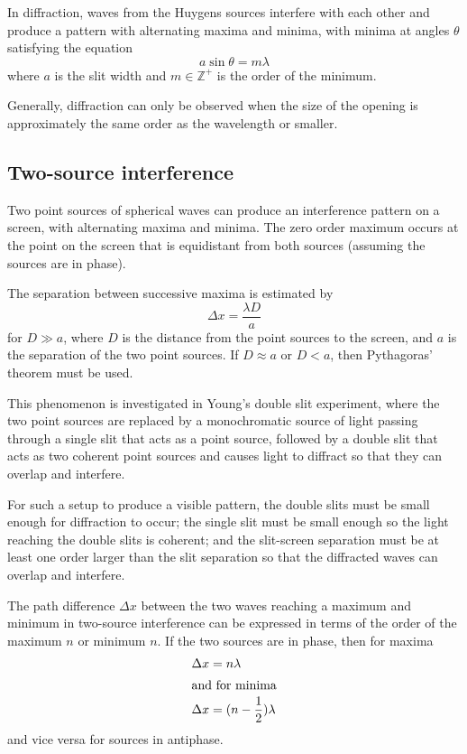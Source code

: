 \documentclass[Physics.tex]{subfiles}
\begin{document}
In diffraction, waves from the Huygens sources interfere with each other and produce a pattern with alternating maxima and minima, with minima at angles \(\theta\) satisfying the equation \begin{equation}a\sin\theta = m\lambda\end{equation} where \(a\) is the slit width and \(m\in\mathbb{Z}^+\) is the order of the minimum.

Generally, diffraction can only be observed when the size of the opening is approximately the same order as the wavelength or smaller.
%
\subsection{Two-source interference}
Two point sources of spherical waves can produce an interference pattern on a screen, with alternating maxima and minima. The zero order maximum occurs at the point on the screen that is equidistant from both sources (assuming the sources are in phase).

The separation between successive maxima is estimated by \begin{equation}\Delta x = \frac{\lambda D}{a}\end{equation} for \(D \gg a\), where \(D\) is the distance from the point sources to the screen, and \(a\) is the separation of the two point sources. If \(D \approx a\) or \(D < a\), then Pythagoras' theorem must be used.

This phenomenon is investigated in Young's double slit experiment, where the two point sources are replaced by a monochromatic source of light passing through a single slit that acts as a point source, followed by a double slit that acts as two coherent point sources and causes light to diffract so that they can overlap and interfere.

For such a setup to produce a visible pattern, the double slits must be small enough for diffraction to occur; the single slit must be small enough so the light reaching the double slits is coherent; and the slit-screen separation must be at least one order larger than the slit separation so that the diffracted waves can overlap and interfere.

The path difference \(\Delta x\) between the two waves reaching a maximum and minimum in two-source interference can be expressed in terms of the order of the maximum \(n\) or minimum \(n\). If the two sources are in phase, then for maxima \begin{align}\Delta x &= n\lambda\\\intertext{and for minima}\Delta x &= (n - \frac{1}{2})\lambda\end{align} and vice versa for sources in antiphase.
%
\end{document}
